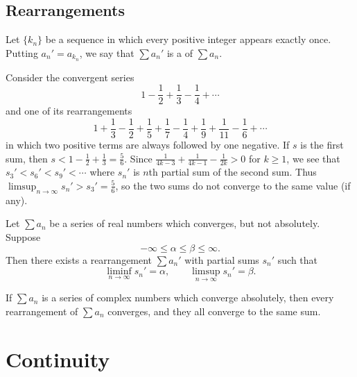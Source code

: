\documentclass{article}
\begin{document}
\subsection{Rearrangements}
\begin{definition}
    Let $\{k_{n}\}$ be a sequence in which every positive integer appears exactly once. Putting $a_{n}'=a_{k_{n}}$, we say that $\sum a_{n}'$ is a  of $\sum a_{n}$.
\end{definition}
\begin{example}
    Consider the convergent series 
    \[1-\frac{1}{2}+\frac{1}{3}-\frac{1}{4}+\dotsi\]and one of its rearrangements 
    \[1+\frac{1}{3}-\frac{1}{2}+\frac{1}{5}+\frac{1}{7}-\frac{1}{4}+\frac{1}{9}+\frac{1}{11}-\frac{1}{6}+\dotsi\]in which two positive terms are always followed by one negative. If $s$ is the first sum, then $s<1-\frac{1}{2}+\frac{1}{3}=\frac{5}{6}.$ Since $\frac{1}{4k-3}+\frac{1}{4k-1}-\frac{1}{2k}>0$ for $k\geq 1$, we see that $s_{3}'<s_{6}'<s_{9}'<\dotsi$ where $s_{n}'$ is $n$th partial sum of the second sum. Thus $\limsup_{n\rightarrow\infty}s_{n}'>s_{3}'=\frac{5}{6}$, so the two sums do not converge to the same value (if any).
\end{example}
\begin{theorem}
    Let $\sum a_{n}$ be a series of real numbers which converges, but not absolutely. Suppose \[-\infty\leq \alpha\leq \beta\leq \infty.\]Then there exists a rearrangement $\sum a_{n}'$ with partial sums $s_{n}'$ such that \[\liminf_{n\rightarrow\infty}s_{n}'=\alpha,\quad\quad \limsup_{n\rightarrow\infty}s_{n}'=\beta.\]
\end{theorem}
\begin{theorem}
    If $\sum a_{n}$ is a series of complex numbers which converge absolutely, then every rearrangement of $\sum a_{n}$ converges, and they all converge to the same sum.
\end{theorem}
\newpage


\section{Continuity}
\end{document}
